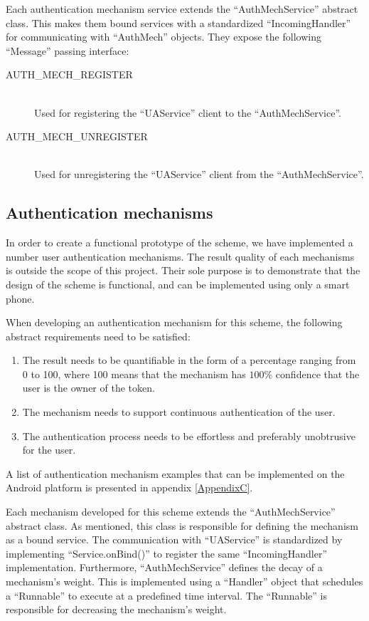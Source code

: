 Each authentication mechanism service extends the ``AuthMechService'' abstract class. This makes them bound services with a standardized ``IncomingHandler'' for communicating with ``AuthMech'' objects. They expose the following ``Message'' passing interface:
\begin{description}
  \item[AUTH\_MECH\_REGISTER] \hfill \\
  Used for registering the ``UAService'' client to the ``AuthMechService''.
  
  \item[AUTH\_MECH\_UNREGISTER] \hfill \\
  Used for unregistering the ``UAService'' client from the ``AuthMechService''.
  \end{description}  
  
\subsection{Authentication mechanisms}
\label{implauthmech}
In order to create a functional prototype of the scheme, we have implemented a number user authentication mechanisms. The result quality of each mechanisms is outside the scope of this project. Their sole purpose is to demonstrate that the design of the scheme is functional, and can be implemented using only a smart phone.

When developing an authentication mechanism for this scheme, the following abstract requirements need to be satisfied: 
\begin{enumerate}
	\item The result needs to be quantifiable in the form of a percentage ranging from 0 to 100, where 100 means that the mechanism has $100\%$ confidence that the user is the owner of the token.
	\item The mechanism needs to support continuous authentication of the user.
	\item The authentication process needs to be effortless and preferably unobtrusive for the user.
\end{enumerate}
A list of authentication mechanism examples that can be implemented on the Android platform is presented in appendix \ref{AppendixC}.

Each mechanism developed for this scheme extends the ``AuthMechService'' abstract class. As mentioned, this class is responsible for defining the mechanism as a bound service. The communication with ``UAService'' is standardized by implementing ``Service.onBind()'' to register the same ``IncomingHandler'' implementation. Furthermore, ``AuthMechService'' defines the decay of a mechanism's weight. This is implemented using a ``Handler'' object that schedules a ``Runnable'' to execute at a predefined time interval. The ``Runnable'' is responsible for decreasing the mechanism's weight.

